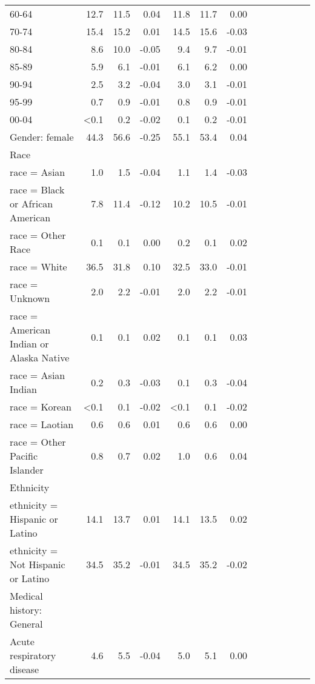 \documentclass[11pt,]{article}
\begin{document}
\begin{longtable}{lrrrrrrrrrrrr}
      60-64 & 12.7 & 11.5 &  0.04 & 11.8 & 11.7 &  0.00 \\ 
      70-74 & 15.4 & 15.2 &  0.01 & 14.5 & 15.6 & -0.03 \\ 
      80-84 &  8.6 & 10.0 & -0.05 &  9.4 &  9.7 & -0.01 \\ 
      85-89 &  5.9 &  6.1 & -0.01 &  6.1 &  6.2 &  0.00 \\ 
      90-94 &  2.5 &  3.2 & -0.04 &  3.0 &  3.1 & -0.01 \\ 
      95-99 &  0.7 &  0.9 & -0.01 &  0.8 &  0.9 & -0.01 \\ 
      00-04 & <0.1 &  0.2 & -0.02 &  0.1 &  0.2 & -0.01 \\ 
  Gender: female & 44.3 & 56.6 & -0.25 & 55.1 & 53.4 &  0.04 \\ 
  Race &    &    &     &    &    &     \\ 
      race = Asian &  1.0 &  1.5 & -0.04 &  1.1 &  1.4 & -0.03 \\ 
      race = Black or African American &  7.8 & 11.4 & -0.12 & 10.2 & 10.5 & -0.01 \\ 
      race = Other Race &  0.1 &  0.1 &  0.00 &  0.2 &  0.1 &  0.02 \\ 
      race = White & 36.5 & 31.8 &  0.10 & 32.5 & 33.0 & -0.01 \\ 
      race = Unknown &  2.0 &  2.2 & -0.01 &  2.0 &  2.2 & -0.01 \\ 
      race = American Indian or Alaska Native &  0.1 &  0.1 &  0.02 &  0.1 &  0.1 &  0.03 \\ 
      race = Asian Indian &  0.2 &  0.3 & -0.03 &  0.1 &  0.3 & -0.04 \\ 
      race = Korean & <0.1 &  0.1 & -0.02 & <0.1 &  0.1 & -0.02 \\ 
      race = Laotian &  0.6 &  0.6 &  0.01 &  0.6 &  0.6 &  0.00 \\ 
      race = Other Pacific Islander &  0.8 &  0.7 &  0.02 &  1.0 &  0.6 &  0.04 \\ 
  Ethnicity &    &    &     &    &    &     \\ 
      ethnicity = Hispanic or Latino & 14.1 & 13.7 &  0.01 & 14.1 & 13.5 &  0.02 \\ 
      ethnicity = Not Hispanic or Latino & 34.5 & 35.2 & -0.01 & 34.5 & 35.2 & -0.02 \\ 
  Medical history: General &    &    &     &    &    &     \\ 
      Acute respiratory disease &  4.6 &  5.5 & -0.04 &  5.0 &  5.1 &  0.00 \\ 

\end{longtable}
\end{document}
